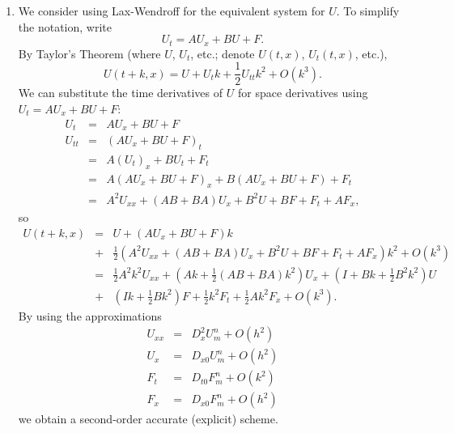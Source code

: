 \documentclass{article}
\begin{document}
\begin{enumerate}
\begin{enumerate}
\item We consider using Lax-Wendroff for the equivalent system for \(U\).  To simplify the notation, write
\[U_t = A U_x + B U + F.\]
By Taylor's Theorem (where \(U\), \(U_t\), etc.; denote \(U(t,x)\), \(U_t(t,x)\), etc.),
\[U(t+k,x) = U + U_t k + \frac{1}{2} U_{tt} k^2 + O(k^3).\]
We can substitute the time derivatives of \(U\) for space derivatives using \(U_t = AU_x + BU + F\):
\begin{eqnarray*}
U_t & = & A U_x + B U + F \\
U_{tt} & = & \left( A U_x + B U + F \right)_t \\
       & = & A \left( U_t \right)_x + B U_t + F_t \\
       & = & A \left( A U_x + B U + F \right)_x + B \left( A U_x + B U + F \right) + F_t \\
       & = & A^2 U_{xx} + (AB + BA) U_x + B^2 U + B F + F_t + A F_x,
\end{eqnarray*}
so
\begin{eqnarray*}
U(t + k, x) & = & U + \left( A U_x + B U + F \right) k \\
            & + & \frac{1}{2} \left( A^2 U_{xx} + (AB + BA) U_x + B^2 U + B F + F_t + A F_x \right) k^2 + O(k^3) \\
            & = & \frac{1}{2} A^2 k^2 U_{xx}
                + \left( A k + \frac{1}{2} (AB + BA) k^2 \right) U_x
                + \left( I + B k + \frac{1}{2} B^2 k^2 \right) U \\
            & + & \left( I k + \frac{1}{2} B k^2 \right) F
                + \frac{1}{2} k^2 F_t
                + \frac{1}{2} A k^2 F_x
                + O(k^3).
\end{eqnarray*}
By using the approximations
\begin{eqnarray*}
U_{xx} & = & D_x^2 U^n_m + O(h^2) \\
U_x & = & D_{x0} U^n_m + O(h^2) \\
F_t & = & D_{t0} F^n_m + O(k^2) \\
F_x & = & D_{x0} F^n_m + O(h^2)
\end{eqnarray*}
we obtain a second-order accurate (explicit) scheme.


\end{enumerate}
\end{enumerate}
\end{document}
